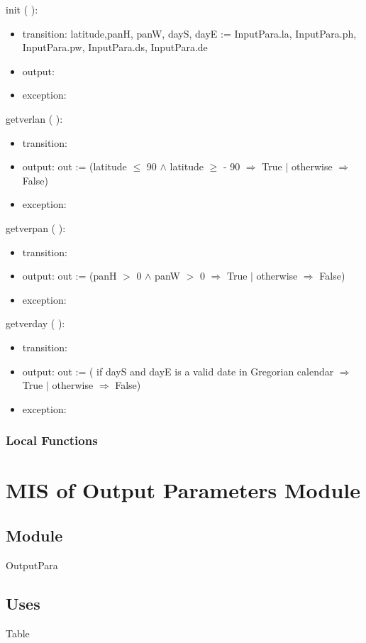 \documentclass[12pt, titlepage]{article}
\begin{document}
\noindent  init ( ):
\begin{itemize}
\item transition: latitude,panH, panW, dayS, dayE := InputPara.la, InputPara.ph, InputPara.pw,  InputPara.ds, InputPara.de
\item output:
\item exception: 
\end{itemize}

\noindent  getverlan ( ):
\begin{itemize}
\item transition: 
\item output: out := (latitude $\leq	$ 90 $\wedge$ latitude $\geq$ - 90 $\Rightarrow	$ True $|$ otherwise $\Rightarrow	$ False)
\item exception: 
\end{itemize}

\noindent  getverpan ( ):
\begin{itemize}
\item transition: 
\item output: out := (panH $>$ 0 $\wedge$ panW $>$ 0 $\Rightarrow	$ True $|$ otherwise $\Rightarrow	$ False)
\item exception: 
\end{itemize}

\noindent  getverday ( ):
\begin{itemize}
\item transition: 
\item output: out := ( if dayS and dayE is a valid date in Gregorian calendar $\Rightarrow	$ True $|$ otherwise $\Rightarrow	$ False)
\item exception: 
\end{itemize}


\subsubsection{Local Functions}

\section{MIS of Output Parameters Module} \label{ModuleIP} 

\subsection{Module}
OutputPara

\subsection{Uses}
Table\\
\end{document}

